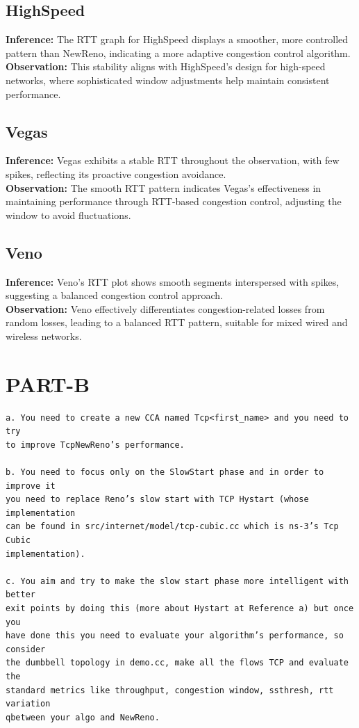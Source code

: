 \documentclass[11pt,a4paper]{article}
\begin{document}
    \subsection{HighSpeed}
    \textbf{Inference:} The RTT graph for HighSpeed displays a smoother, more controlled pattern than NewReno, indicating a more adaptive congestion control algorithm.\\
    \textbf{Observation:} This stability aligns with HighSpeed's design for high-speed networks, where sophisticated window adjustments help maintain consistent performance.
    
    \subsection{Vegas}
    \textbf{Inference:} Vegas exhibits a stable RTT throughout the observation, with few spikes, reflecting its proactive congestion avoidance.\\
    \textbf{Observation:} The smooth RTT pattern indicates Vegas's effectiveness in maintaining performance through RTT-based congestion control, adjusting the window to avoid fluctuations.
    
    \subsection{Veno}
    \textbf{Inference:} Veno's RTT plot shows smooth segments interspersed with spikes, suggesting a balanced congestion control approach.\\
    \textbf{Observation:} Veno effectively differentiates congestion-related losses from random losses, leading to a balanced RTT pattern, suitable for mixed wired and wireless networks.


\section{PART-B}
\begin{verbatim}
a. You need to create a new CCA named Tcp<first_name> and you need to try 
to improve TcpNewReno’s performance. 

b. You need to focus only on the SlowStart phase and in order to improve it 
you need to replace Reno’s slow start with TCP Hystart (whose implementation
can be found in src/internet/model/tcp-cubic.cc which is ns-3’s Tcp Cubic 
implementation).

c. You aim and try to make the slow start phase more intelligent with better 
exit points by doing this (more about Hystart at Reference a) but once you 
have done this you need to evaluate your algorithm’s performance, so consider
the dumbbell topology in demo.cc, make all the flows TCP and evaluate the 
standard metrics like throughput, congestion window, ssthresh, rtt variation 
qbetween your algo and NewReno.
\end{verbatim}
\end{document}
